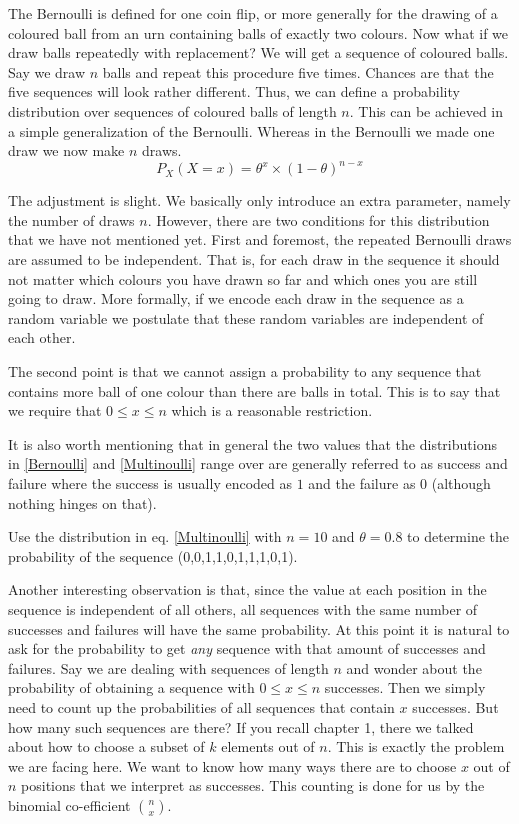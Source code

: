 \documentclass[a4paper,11pt,leqno]{report}
\begin{document}
The Bernoulli is defined for one coin flip, or more generally for the drawing of a coloured ball from an urn containing balls
of exactly two colours. Now what if we draw balls repeatedly with replacement? We will get a sequence of coloured balls. 
Say we draw $ n $ balls and repeat this procedure five times. Chances are that the five sequences will look rather different.
Thus, we can define a probability distribution over sequences of coloured balls of length $ n $. This can be achieved in a simple generalization
of the Bernoulli. Whereas in the Bernoulli we made one draw we now make $ n $ draws.
\begin{equation}\label{Multinoulli}
P_{X}(X=x) = \theta^{x} \times (1 - \theta)^{n-x}
\end{equation}

The adjustment is slight. We basically only introduce an extra parameter, namely the number of draws $ n $. 
However, there are two conditions for this distribution that we have not mentioned yet. First and foremost,
the repeated Bernoulli draws are assumed to be independent. That is, for each draw in the sequence it should not matter which colours you
have drawn so far and which ones you are still going to draw. More formally, if we encode each draw in the sequence as a random
variable we postulate that these random variables are independent of each other. 

The second point is that we cannot assign a probability to any sequence that contains more ball of one colour than there are balls in total.
This is to say that we require that $ 0 \leq x \leq n $ which is a reasonable restriction. 

It is also worth mentioning that in general the two values that the distributions in \ref{Bernoulli} and \ref{Multinoulli} range
over are generally referred to as success and failure where the success is usually encoded as $ 1 $ and the failure as $ 0 $
(although nothing hinges on that). 

\begin{Exercise}
Use the distribution in eq. \ref{Multinoulli} with $ n = 10 $ and $ \theta = 0.8 $ to determine the probability of the sequence (0,0,1,1,0,1,1,1,0,1).
\end{Exercise}

Another interesting observation is that, since the value at each position in the sequence is independent of all others, all sequences with the same
number of successes and failures will have the same probability. At this point it is natural to ask for the probability to get \textit{any}
sequence with that amount of successes and failures. Say we are dealing with sequences of length $ n $ and wonder about the probability of 
obtaining a sequence with $ 0 \leq x \leq n $ successes. Then we simply need to count up the probabilities of all sequences that contain $ x $ 
successes. But how many such sequences are there? If you recall chapter 1, there we talked about how to choose a subset of $ k $ elements
out of $ n $. This is exactly the problem we are facing here. We want to know how many ways there are to choose $ x $ out of $ n $ positions
that we interpret as successes. This counting is done for us by the binomial co-efficient $ \binom{n}{x} $.
\end{document}
